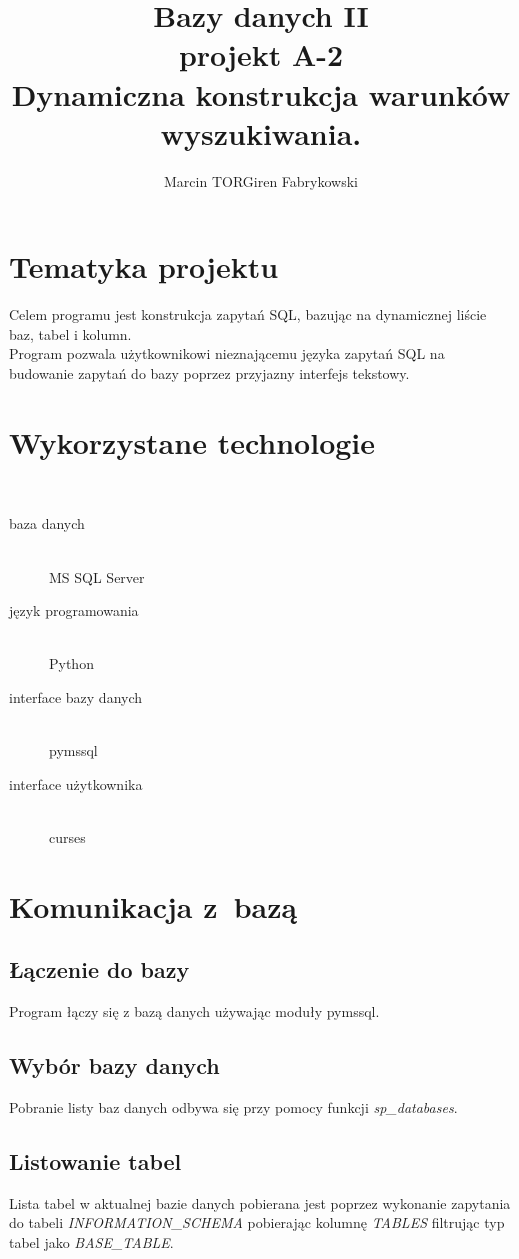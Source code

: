 \documentclass[a4paper,12pt]{article}
\author{Marcin TORGiren Fabrykowski}
\title{Bazy danych II\\ projekt A-2\\Dynamiczna konstrukcja warunków wyszukiwania.}
\begin{document}
\maketitle
\newpage
\tableofcontents
\newpage
\section{Tematyka projektu}
Celem programu jest konstrukcja zapytań SQL, bazując na dynamicznej liście baz, tabel i kolumn.\\
Program pozwala użytkownikowi nieznającemu języka zapytań SQL na budowanie zapytań do bazy poprzez przyjazny interfejs tekstowy.
\section{Wykorzystane technologie}\
\begin{description}
\item[baza danych]\hfill \\
	MS SQL Server
\item[język programowania]\hfill \\
	Python
\item[interface bazy danych]\hfill \\
	pymssql	
\item[interface użytkownika]\hfill \\
	curses
\end{description}
\section{Komunikacja z~bazą}
\subsection{Łączenie do bazy}
Program łączy się z bazą danych używając moduły pymssql.\\
\subsection{Wybór bazy danych}
Pobranie listy baz danych odbywa się przy pomocy funkcji \textit{sp\_databases}.\\
\subsection{Listowanie tabel}
Lista tabel w aktualnej bazie danych pobierana jest poprzez wykonanie zapytania do tabeli \textit{INFORMATION\_SCHEMA} pobierając kolumnę \textit{TABLES} filtrując typ tabel jako \textit{BASE\_TABLE}.
\end{document}
